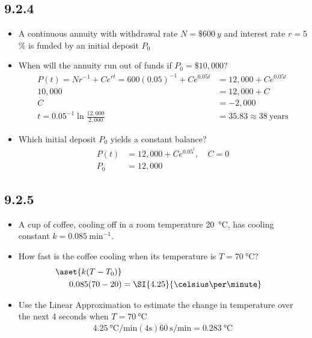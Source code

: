 \begin{itemize}
    \subsection{9.2.4}
    \begin{itemize}
      \item A continuous annuity with withdrawal rate \( N = \$\SI{600}{y}
        \) and interest rate \( r = 5 \)\% is funded by an initial deposit \(
        P_0 \)
      \item When will the annuity run out of funds if \( P_0 = \$10,000 \)?
        \begin{align*}
          P(t) = Nr^{-1} + Ce^{rt} = 600(0.05)^{-1} + Ce^{0.05t} &= 12,000 +
          Ce^{0.05t} \\
          10,000 &= 12,000 + C \\
          C &= -2,000 \\
          t = 0.05^{-1} \ln \frac{12,000}{2,000} &= 35.83 \approx38~\text{years}
        \end{align*}
      \item Which initial deposit \( P_0 \) yields a constant balance?
        \begin{align*}
          P(t) &= 12,000 + Ce^{0.05^t}, \quad C = 0 \\
          P_0 &= 12,000
        \end{align*}
    \end{itemize}

    \subsection{9.2.5}
    \begin{itemize}
      \item A cup of coffee, cooling off in a room temperature
        \SI{20}{\celsius}, has cooling constant \( k = 0.085~\text{min}^{-1}\).

      \item How fast is the coffee cooling when its temperature is \( T =
        \SI{70}{\celsius} \)?
        \begin{align*}
          \aset{k(T-T_0)} \\
          0.085(70-20) &= \SI{4.25}{\celsius\per\minute} \\
        \end{align*}

      \item Use the Linear Approximation to estimate the change in temperature
        over the next 4 seconds when \( T= \SI{70}{\celsius} \)
        \begin{align*}
          \SI{4.25}{\celsius\per\minute}(4\text{s})\SI{60}{\s\per\minute} =
          \SI{0.283}{\celsius}
        \end{align*}


\end{itemize}
\end{itemize}
